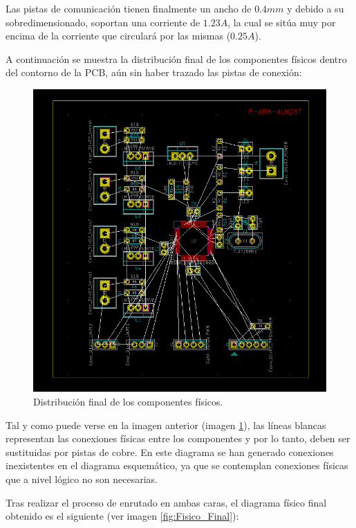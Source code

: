 Las pistas de comunicación tienen finalmente un ancho de $0.4mm$ y debido a su sobredimensionado, soportan una corriente de $1.23A$, la cual se sitúa muy por encima de la corriente que circulará por las mismas ($0.25A$).

A continuación se muestra la distribución final de los componentes físicos dentro del contorno de la \ac{PCB}, aún sin haber trazado las pistas de conexión:

\begin{figure}[H]
\centering
\includegraphics[width=0.9\linewidth]{pictures/DistribucionInicial.PNG}
\caption{Distribución final de los componentes físicos.}
\label{fig:Distribución final}
\end{figure}

Tal y como puede verse en la imagen anterior (imagen \ref{fig:Distribución final}), las líneas blancas representan las conexiones físicas entre los componentes y por lo tanto, deben ser sustituidas por pistas de cobre. En este diagrama se han generado conexiones inexistentes en el diagrama esquemático, ya que se contemplan conexiones físicas que a nivel lógico no son necesarias.

Tras realizar el proceso de enrutado en ambas caras, el diagrama físico final obtenido es el siguiente (ver imagen \ref{fig:Fisico_Final}):

